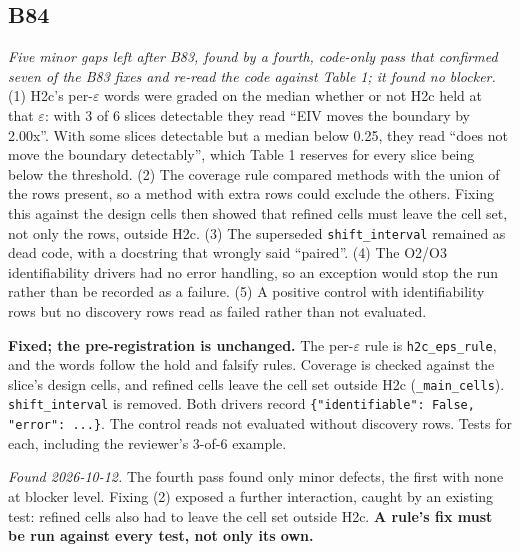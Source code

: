 \documentclass[10pt]{article}
\begin{document}
\subsection*{B84}\label{led:B84}
\begin{description}[leftmargin=0pt,itemsep=1pt]
\item[Defect.] \emph{Five minor gaps left after B83, found by a fourth, code-only pass that confirmed seven of the B83 fixes and re-read the code against Table 1; it found no blocker.} (1) H2c's per-$\varepsilon$ words were graded on the median whether or not H2c held at that $\varepsilon$: with 3 of 6 slices detectable they read ``EIV moves the boundary by 2.00x''. With some slices detectable but a median below 0.25, they read ``does not move the boundary detectably'', which Table 1 reserves for every slice being below the threshold. (2) The coverage rule compared methods with the union of the rows present, so a method with extra rows could exclude the others. Fixing this against the design cells then showed that refined cells must leave the cell set, not only the rows, outside H2c. (3) The superseded \texttt{shift\_interval} remained as dead code, with a docstring that wrongly said ``paired''. (4) The O2/O3 identifiability drivers had no error handling, so an exception would stop the run rather than be recorded as a failure. (5) A positive control with identifiability rows but no discovery rows read as failed rather than not evaluated.
\item[Resolution.] \textbf{Fixed; the pre-registration is unchanged.} The per-$\varepsilon$ rule is \texttt{h2c\_eps\_rule}, and the words follow the hold and falsify rules. Coverage is checked against the slice's design cells, and refined cells leave the cell set outside H2c (\texttt{\_main\_cells}). \texttt{shift\_interval} is removed. Both drivers record \texttt{\{"identifiable": False, "error": ...\}}. The control reads not evaluated without discovery rows. Tests for each, including the reviewer's 3-of-6 example.
\item[Note.] \emph{Found 2026-10-12.} The fourth pass found only minor defects, the first with none at blocker level. Fixing (2) exposed a further interaction, caught by an existing test: refined cells also had to leave the cell set outside H2c. \textbf{A rule's fix must be run against every test, not only its own.}
\end{description}
\end{document}
